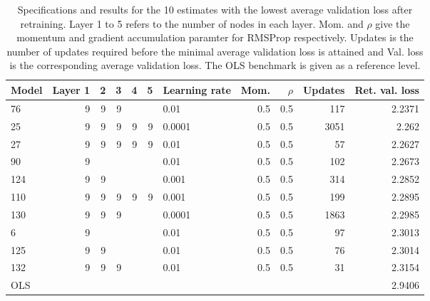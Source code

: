 \begin{table}
\centering
\caption{Specifications and results for the 10 estimates with the lowest average validation loss after retraining. Layer 1 to 5 refers to the number of nodes in each layer. Mom. and $\rho$ give the momentum and gradient accumulation paramter for RMSProp respectively. Updates is the number of updates required before the minimal average validation loss is attained and Val. loss is the corresponding average validation loss. The OLS benchmark is given as a reference level.}
\label{tab:Best_results_retrained}
\begin{tabular}{lrrrrrlrrrr}
\toprule
Model & Layer 1 & 2 & 3 & 4 & 5 & Learning rate & Mom. & $\rho$ & Updates & Ret. val. loss \\
\midrule
   76 &       9 & 9 & 9 &   &   &          0.01 &  0.5 &    0.5 &     117 &         2.2371 \\
   25 &       9 & 9 & 9 & 9 & 9 &        0.0001 &  0.5 &    0.5 &    3051 &          2.262 \\
   27 &       9 & 9 & 9 & 9 & 9 &          0.01 &  0.5 &    0.5 &      57 &         2.2627 \\
   90 &       9 &   &   &   &   &          0.01 &  0.5 &    0.5 &     102 &         2.2673 \\
  124 &       9 & 9 &   &   &   &         0.001 &  0.5 &    0.5 &     314 &         2.2852 \\
  110 &       9 & 9 & 9 & 9 & 9 &         0.001 &  0.5 &    0.5 &     199 &         2.2895 \\
  130 &       9 & 9 & 9 &   &   &        0.0001 &  0.5 &    0.5 &    1863 &         2.2985 \\
    6 &       9 &   &   &   &   &          0.01 &  0.5 &    0.5 &      97 &         2.3013 \\
  125 &       9 & 9 &   &   &   &          0.01 &  0.5 &    0.5 &      76 &         2.3014 \\
  132 &       9 & 9 & 9 &   &   &          0.01 &  0.5 &    0.5 &      31 &         2.3154 \\
  OLS &         &   &   &   &   &               &      &        &         &         2.9406 \\
\bottomrule
\end{tabular}
\end{table}
